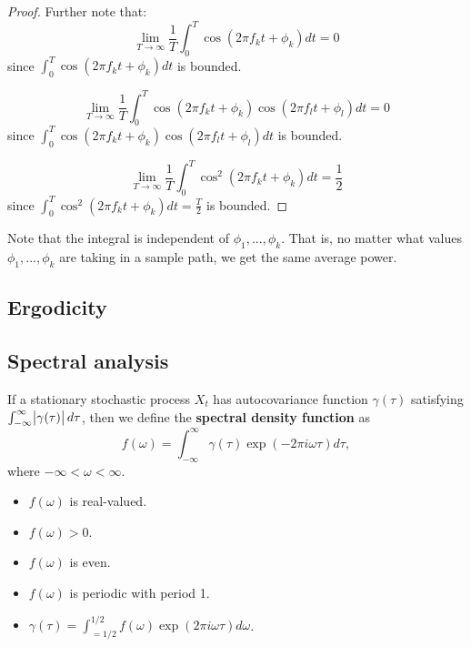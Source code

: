 \begin{refsection}
\begin{proof}
	Further note that:
	$$\lim_{T\to \infty} \frac{1}{T} \int_0^T \cos(2\pi f_k t + \phi_k) dt = 0$$
	since $\int_0^T \cos(2\pi f_k t + \phi_k) dt$ is bounded. 
	
	
	$$\lim_{T\to \infty} \frac{1}{T} \int_0^T \cos(2\pi f_k t + \phi_k)\cos(2\pi f_l t + \phi_l)dt = 0$$
	since $\int_0^T \cos(2\pi f_k t + \phi_k)\cos(2\pi f_l t + \phi_l)dt$ is bounded. 
	
	$$\lim_{T\to \infty} \frac{1}{T} \int_0^T \cos^2(2\pi f_k t + \phi_k)dt = \frac{1}{2}$$
	since $\int_0^T \cos^2(2\pi f_k t + \phi_k)dt = \frac{T}{2}$ is bounded. 
	
\end{proof}


\begin{remark}
Note that the integral is independent of $\phi_1,...,\phi_k$. That is, no matter what values  $\phi_1,...,\phi_k$ are taking in a sample path, we get the same average power.	
\end{remark}


\subsection{Ergodicity}




\subsection{Spectral analysis}

\begin{definition}
If a stationary stochastic process $X_t$ has autocovariance function $\gamma(\tau)$ satisfying $\int_{-\infty}^{\infty} \abs{\gamma(\tau)}d\tau$, then we define the \textbf{spectral density function} as
$$f(\omega) = \int_{-\infty}^{\infty} \gamma(\tau) \exp(-2\pi i \omega \tau) d\tau,$$
where $-\infty < \omega < \infty$.	
\end{definition}


\begin{lemma}\hfill
\begin{itemize}
	\item $f(\omega)$ is real-valued.
	\item $f(\omega) > 0$.
	\item $f(\omega)$ is even.
	\item $f(\omega)$ is periodic with period 1.
	\item $\gamma(\tau) = \int_{=1/2}^{1/2} f(\omega) \exp(2\pi i \omega \tau) d\omega$.
\end{itemize}	
\end{lemma}



\end{refsection}

